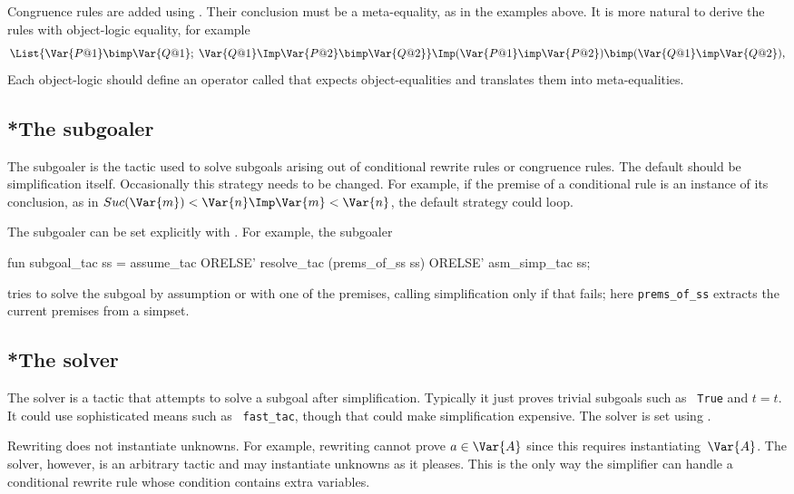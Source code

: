 Congruence rules are added using .  Their conclusion
must be a meta-equality, as in the examples above.  It is more
natural to derive the rules with object-logic equality, for example
\[ \List{\Var{P@1} \bimp \Var{Q@1};\; \Var{Q@1} \Imp \Var{P@2} \bimp \Var{Q@2}}
   \Imp (\Var{P@1} \imp \Var{P@2}) \bimp (\Var{Q@1} \imp \Var{Q@2}),
\]
Each object-logic should define an operator called  that
expects object-equalities and translates them into meta-equalities.

\subsection{*The subgoaler}
The subgoaler is the tactic used to solve subgoals arising out of
conditional rewrite rules or congruence rules.  The default should be
simplification itself.  Occasionally this strategy needs to be changed.  For
example, if the premise of a conditional rule is an instance of its
conclusion, as in $Suc(\Var{m}) < \Var{n} \Imp \Var{m} < \Var{n}$, the
default strategy could loop.

The subgoaler can be set explicitly with .  For
example, the subgoaler
\begin{ttbox}
fun subgoal_tac ss = assume_tac ORELSE'
                     resolve_tac (prems_of_ss ss) ORELSE' 
                     asm_simp_tac ss;
\end{ttbox}
tries to solve the subgoal by assumption or with one of the premises, calling
simplification only if that fails; here {\tt prems_of_ss} extracts the
current premises from a simpset.

\subsection{*The solver}
The solver is a tactic that attempts to solve a subgoal after
simplification.  Typically it just proves trivial subgoals such as {\tt
  True} and $t=t$.  It could use sophisticated means such as {\tt
  fast_tac}, though that could make simplification expensive.  The solver
is set using .

Rewriting does not instantiate unknowns.  For example, rewriting cannot
prove $a\in \Var{A}$ since this requires instantiating~$\Var{A}$.  The
solver, however, is an arbitrary tactic and may instantiate unknowns as it
pleases.  This is the only way the simplifier can handle a conditional
rewrite rule whose condition contains extra variables.

